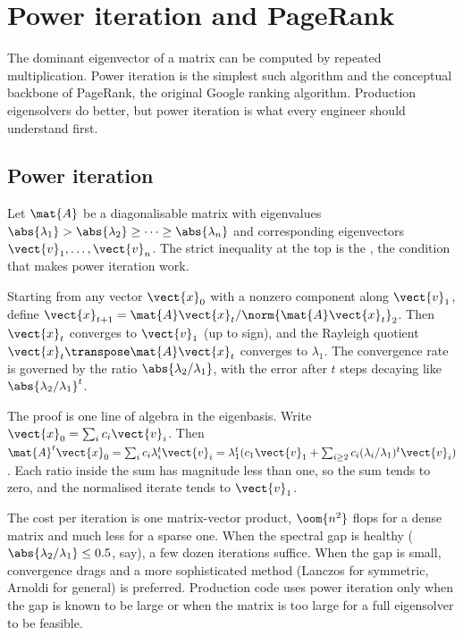 \section{Power iteration and PageRank}

The dominant eigenvector of a matrix can be computed by repeated
multiplication. Power iteration is the simplest such algorithm and
the conceptual backbone of PageRank, the original Google ranking
algorithm. Production eigensolvers do better, but power iteration
is what every engineer should understand first.

\subsection{Power iteration}

Let $\mat{A}$ be a diagonalisable matrix with eigenvalues $\abs{\lambda_{1}}
> \abs{\lambda_{2}} \geq \cdots \geq \abs{\lambda_{n}}$ and
corresponding eigenvectors $\vect{v}_{1}, \ldots, \vect{v}_{n}$. The
strict inequality at the top is the , the
condition that makes power iteration work.

\begin{principle}
Starting from any vector $\vect{x}_{0}$ with a nonzero component
along $\vect{v}_{1}$, define $\vect{x}_{t+1} = \mat{A} \vect{x}_{t} /
\norm{\mat{A} \vect{x}_{t}}_{2}$. Then $\vect{x}_{t}$ converges to
$\vect{v}_{1}$ (up to sign), and the Rayleigh quotient $\vect{x}_{t}
\transpose \mat{A} \vect{x}_{t}$ converges to $\lambda_{1}$. The
convergence rate is governed by the ratio $\abs{\lambda_{2}/\lambda_{1}}$,
with the error after $t$ steps decaying like $\abs{\lambda_{2}/
\lambda_{1}}^{t}$.
\end{principle}

The proof is one line of algebra in the eigenbasis. Write
$\vect{x}_{0} = \sum_{i} c_{i} \vect{v}_{i}$. Then $\mat{A}^{t}
\vect{x}_{0} = \sum_{i} c_{i} \lambda_{i}^{t} \vect{v}_{i} =
\lambda_{1}^{t} (c_{1} \vect{v}_{1} + \sum_{i \geq 2} c_{i}
(\lambda_{i}/\lambda_{1})^{t} \vect{v}_{i})$. Each ratio inside the
sum has magnitude less than one, so the sum tends to zero, and the
normalised iterate tends to $\vect{v}_{1}$.

The cost per iteration is one matrix-vector product, $\oom{n^{2}}$
flops for a dense matrix and much less for a sparse one. When the
spectral gap is healthy ($\abs{\lambda_{2}/\lambda_{1}} \leq 0.5$,
say), a few dozen iterations suffice. When the gap is small,
convergence drags and a more sophisticated method (Lanczos for
symmetric, Arnoldi for general) is preferred. Production code uses
power iteration only when the gap is known to be large or when the
matrix is too large for a full eigensolver to be feasible.

